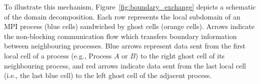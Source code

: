 \documentclass[12pt,a4paper]{report}
\begin{document}
To illustrate this mechanism, Figure~\ref{fig:boundary_exchange} depicts a schematic of the domain decomposition. Each row represents the local subdomain of an MPI process (blue cells) sandwiched by ghost cells (orange cells). Arrows indicate the non-blocking communication flow which transfers boundary information between neighbouring processes. Blue arrows represent data sent from the first local cell of a process (e.g., Process $A$ or $B$) to the right ghost cell of its neighbouring process, and red arrows indicate data sent from the last local cell (i.e., the last blue cell) to the left ghost cell of the adjacent process.
\begin{figure}[htbp]
    \centering
\end{figure}
\end{document}
